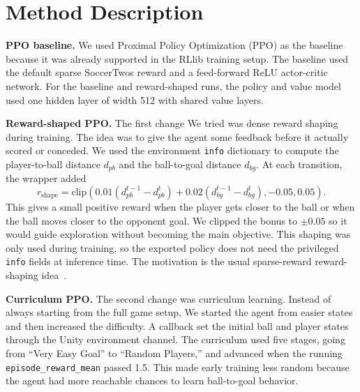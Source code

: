 \documentclass{article}
\begin{document}



\section{Method Description}

\textbf{PPO baseline.}
We used Proximal Policy Optimization (PPO) as the baseline because it was already supported in the RLlib training setup. The baseline used the default sparse SoccerTwos reward and a feed-forward ReLU actor-critic network. For the baseline and reward-shaped runs, the policy and value model used one hidden layer of width 512 with shared value layers.

\textbf{Reward-shaped PPO.}
The first change We tried was dense reward shaping during training. The idea was to give the agent some feedback before it actually scored or conceded. We used the environment \texttt{info} dictionary to compute the player-to-ball distance \(d_{pb}\) and the ball-to-goal distance \(d_{bg}\). At each transition, the wrapper added
\[
r_{\mathrm{shape}} =
\mathrm{clip}\left(0.01(d_{pb}^{t-1}-d_{pb}^{t}) +
0.02(d_{bg}^{t-1}-d_{bg}^{t}), -0.05, 0.05\right).
\]
This gives a small positive reward when the player gets closer to the ball or when the ball moves closer to the opponent goal. We clipped the bonus to \(\pm 0.05\) so it would guide exploration without becoming the main objective. This shaping was only used during training, so the exported policy does not need the privileged \texttt{info} fields at inference time. The motivation is the usual sparse-reward reward-shaping idea~\citep{ng1999policy}.

\textbf{Curriculum PPO.}
The second change was curriculum learning. Instead of always starting from the full game setup, We started the agent from easier states and then increased the difficulty. A callback set the initial ball and player states through the Unity environment channel. The curriculum used five stages, going from ``Very Easy Goal'' to ``Random Players,'' and advanced when the running \texttt{episode\_reward\_mean} passed 1.5. This made early training less random because the agent had more reachable chances to learn ball-to-goal behavior.
\end{document}
